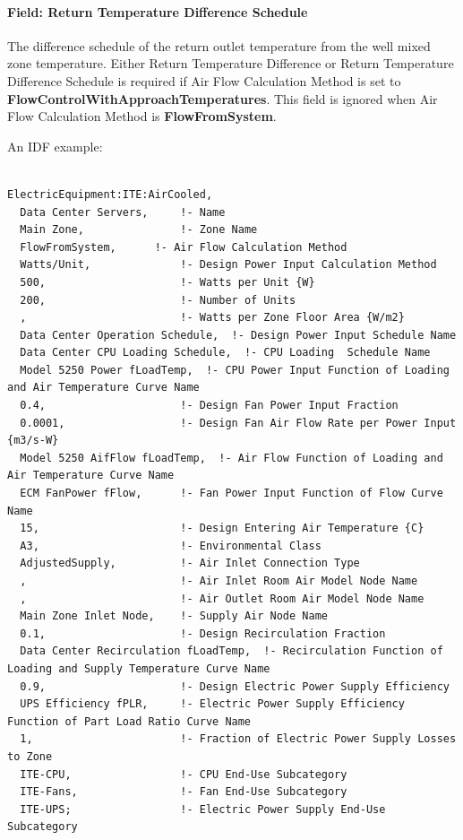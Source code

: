 \paragraph{Field: Return Temperature Difference Schedule}\label{field-return-temperature-difference-schedule}

The difference schedule of the return outlet temperature from the well mixed zone temperature. Either Return Temperature Difference or Return Temperature Difference Schedule is required if Air Flow Calculation Method is set to \textbf{FlowControlWithApproachTemperatures}. This field is ignored when Air Flow Calculation Method is \textbf{FlowFromSystem}.

An IDF example:

\begin{lstlisting}

ElectricEquipment:ITE:AirCooled,
  Data Center Servers,     !- Name
  Main Zone,               !- Zone Name
  FlowFromSystem,      !- Air Flow Calculation Method
  Watts/Unit,              !- Design Power Input Calculation Method
  500,                     !- Watts per Unit {W}
  200,                     !- Number of Units
  ,                        !- Watts per Zone Floor Area {W/m2}
  Data Center Operation Schedule,  !- Design Power Input Schedule Name
  Data Center CPU Loading Schedule,  !- CPU Loading  Schedule Name
  Model 5250 Power fLoadTemp,  !- CPU Power Input Function of Loading and Air Temperature Curve Name
  0.4,                     !- Design Fan Power Input Fraction
  0.0001,                  !- Design Fan Air Flow Rate per Power Input {m3/s-W}
  Model 5250 AifFlow fLoadTemp,  !- Air Flow Function of Loading and Air Temperature Curve Name
  ECM FanPower fFlow,      !- Fan Power Input Function of Flow Curve Name
  15,                      !- Design Entering Air Temperature {C}
  A3,                      !- Environmental Class
  AdjustedSupply,          !- Air Inlet Connection Type
  ,                        !- Air Inlet Room Air Model Node Name
  ,                        !- Air Outlet Room Air Model Node Name
  Main Zone Inlet Node,    !- Supply Air Node Name
  0.1,                     !- Design Recirculation Fraction
  Data Center Recirculation fLoadTemp,  !- Recirculation Function of Loading and Supply Temperature Curve Name
  0.9,                     !- Design Electric Power Supply Efficiency
  UPS Efficiency fPLR,     !- Electric Power Supply Efficiency Function of Part Load Ratio Curve Name
  1,                       !- Fraction of Electric Power Supply Losses to Zone
  ITE-CPU,                 !- CPU End-Use Subcategory
  ITE-Fans,                !- Fan End-Use Subcategory
  ITE-UPS;                 !- Electric Power Supply End-Use Subcategory
\end{lstlisting}

